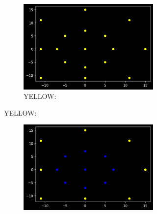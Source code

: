 \begin{figure}[H]
  {
    \setlength{\tabcolsep}{3.0pt}
    \setlength\cmidrulewidth{\heavyrulewidth} %
    \begin{adjustbox}{width=15cm,center}
      \begin{subfigure}{0.3\textwidth}
        \begin{figure}[H]
          \centering
          \begin{adjustbox}{width=4cm,center}
            \includegraphics[width=12cm]{src/bullets/yellow_graph.png}%
          \end{adjustbox}
          \caption{YELLOW: }
        \end{figure}
      \end{subfigure}
      \begin{subfigure}{0.3\textwidth}
        \begin{figure}[H]
          \centering
          \begin{adjustbox}{width=4cm,center}
            \includegraphics[width=12cm]{src/bullets/blue_graph.png}%

\end{adjustbox}
\end{figure}
\end{subfigure}
\end{adjustbox}}
\end{figure}
